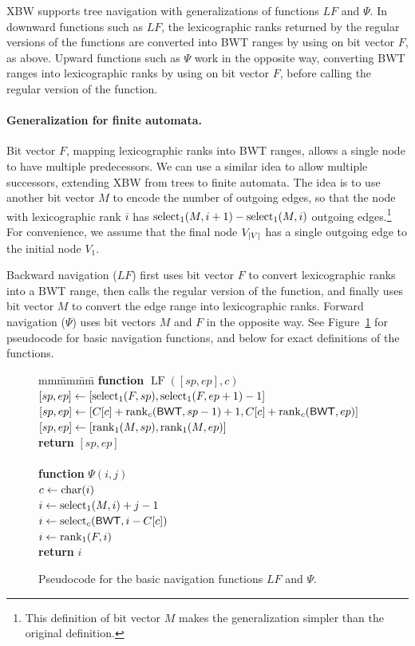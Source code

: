 XBW supports tree navigation with generalizations of functions $LF$ and $\Psi$. In downward functions such as $LF$, the lexicographic ranks returned by the regular versions of the functions are converted into BWT ranges by using \select{} on bit vector $F$, as above. Upward functions such as $\Psi$ work in the opposite way, converting BWT ranges into lexicographic ranks by using \rank{} on bit vector $F$, before calling the regular version of the function.

\paragraph{Generalization for finite automata.}

Bit vector $F$, mapping lexicographic ranks into BWT ranges, allows a single node to have multiple predecessors. We can use a similar idea to allow multiple successors, extending XBW from trees to finite automata. The idea is to use another bit vector $M$ to encode the number of outgoing edges, so that the node with lexicographic rank $i$ has $\operatorname{select}_{1}(M,i+1) - \operatorname{select}_{1}(M,i)$ outgoing edges.\footnote{This definition of bit vector $M$ makes the generalization simpler than the original definition.} For convenience, we assume that the final node $V_{\lvert V \rvert}$ has a single outgoing edge to the initial node $V_{1}$.

Backward navigation ($LF$) first uses bit vector $F$ to convert lexicographic ranks into a BWT range, then calls the regular version of the function, and finally uses bit vector $M$ to convert the edge range into lexicographic ranks. Forward navigation ($\Psi$) uses bit vectors $M$ and $F$ in the opposite way. See Figure~\ref{fig:gcsa navigation} for pseudocode for basic navigation functions, and below for exact definitions of the functions.

\begin{figure}[t!]\centering
\begin{tabbing}
mm\=mm\=mm\= \kill
{\bf function} $\operatorname{LF}([sp,ep], c)$ \\
\> $[sp, ep] \leftarrow [\operatorname{select}_{1}(F,sp), \operatorname{select}_{1}(F,ep+1) - 1]$ \\
\> $[sp, ep] \leftarrow [C[c] + \operatorname{rank}_{c}(\mathsf{BWT}, sp - 1) + 1, C[c] + \operatorname{rank}_{c}(\mathsf{BWT}, ep)]$ \\
\> $[sp, ep] \leftarrow [\operatorname{rank}_{1}(M,sp), \operatorname{rank}_{1}(M,ep)]$ \\
\> {\bf return} $[sp,ep]$ \\
\\
{\bf function} $\Psi(i, j)$ \\
\> $c \leftarrow \operatorname{char}(i)$ \\
\> $i \leftarrow \operatorname{select}_{1}(M,i) + j - 1$ \\
\> $i \leftarrow \operatorname{select}_{c}(\mathsf{BWT}, i - C[c])$ \\
\> $i \leftarrow \operatorname{rank}_{1}(F,i)$ \\
\> {\bf return} $i$
\end{tabbing}

\caption{Pseudocode for the basic navigation functions $LF$ and $\Psi$.}\label{fig:gcsa navigation}
\end{figure}

